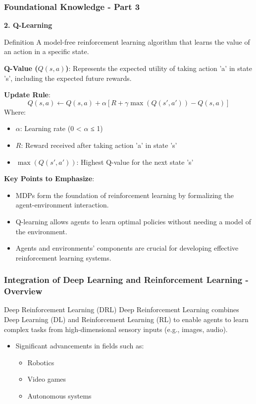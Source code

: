 \documentclass[aspectratio=169]{beamer}
\begin{document}
\begin{frame}[fragile]
    \frametitle{Foundational Knowledge - Part 3}
    \textbf{2. Q-Learning}

    \begin{block}{Definition}
        A model-free reinforcement learning algorithm that learns the value of an action in a specific state.
    \end{block}
    
    \textbf{Q-Value ($Q(s, a)$)}:
    Represents the expected utility of taking action 'a' in state 's', including the expected future rewards.

    \textbf{Update Rule}:
    \begin{equation}
        Q(s, a) \leftarrow Q(s, a) + \alpha \left[ R + \gamma \max(Q(s', a')) - Q(s, a) \right]
    \end{equation}
    Where:
    \begin{itemize}
        \item $\alpha$: Learning rate (0 < $\alpha$ ≤ 1)
        \item $R$: Reward received after taking action 'a' in state 's'
        \item $\max(Q(s', a'))$: Highest Q-value for the next state 's'
    \end{itemize}

    \textbf{Key Points to Emphasize}:
    \begin{itemize}
        \item MDPs form the foundation of reinforcement learning by formalizing the agent-environment interaction.
        \item Q-learning allows agents to learn optimal policies without needing a model of the environment.
        \item Agents and environments' components are crucial for developing effective reinforcement learning systems.
    \end{itemize}
\end{frame}

\begin{frame}[fragile]
    \frametitle{Integration of Deep Learning and Reinforcement Learning - Overview}
    \begin{block}{Deep Reinforcement Learning (DRL)}
        Deep Reinforcement Learning combines Deep Learning (DL) and Reinforcement Learning (RL) to enable agents to learn complex tasks from high-dimensional sensory inputs (e.g., images, audio).
    \end{block}
    \begin{itemize}
        \item Significant advancements in fields such as:
        \begin{itemize}
            \item Robotics
            \item Video games
            \item Autonomous systems
        \end{itemize}
    \end{itemize}
\end{frame}
\end{document}
